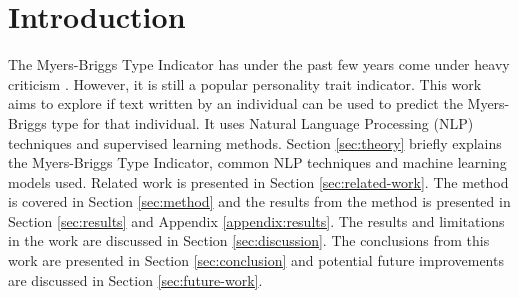 \section{Introduction}

The Myers-Briggs Type Indicator has under the past few years come under heavy criticism \cite{pittenger1993, grant-mbti, rose-mbti, bbc-mbti, winkie-mbti}.
However, it is still a popular \cite{MBTI-trend} personality trait indicator.
This work aims to explore if text written by an individual can be used to predict the Myers-Briggs type for that individual.
It uses Natural Language Processing (NLP) techniques and supervised learning methods.
Section \ref{sec:theory} briefly explains the Myers-Briggs Type Indicator, common NLP techniques and machine learning models used.
Related work is presented in Section \ref{sec:related-work}.
The method is covered in Section \ref{sec:method} and the results from the method is presented in Section \ref{sec:results} and Appendix \ref{appendix:results}.
The results and limitations in the work are discussed in Section \ref{sec:discussion}.
The conclusions from this work are presented in Section \ref{sec:conclusion} and potential future improvements are discussed in Section \ref{sec:future-work}.
